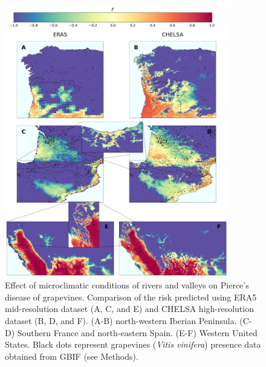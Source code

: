 \begin{figure}[H]
    \centering
    \includegraphics[width=0.87\textwidth]{Figures/ERA5_vs_CHELSA_rivers.pdf}
    \caption[Effect of microclimatic conditions of rivers and valleys on
        PD]{Effect of microclimatic conditions of rivers and valleys on
        Pierce's disease of grapevines. Comparison of the risk predicted using
        ERA5 mid-resolution dataset (A, C, and E) and CHELSA high-resolution
        dataset (B, D, and F). (A-B) north-western Iberian Peninsula. (C-D)
        Southern France and north-eastern Spain. (E-F) Western United States.
        Black dots represent grapevines (\textit{Vitis vinifera}) presence data
        obtained from GBIF (see Methods).}
    \label{fig:microclimates}
\end{figure}

